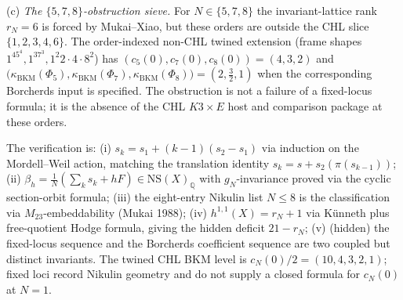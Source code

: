 \begin{remark}
\textup{(c)} \emph{The $\{5,7,8\}$-obstruction sieve.}
For $N\in\{5,7,8\}$ the invariant-lattice rank $r_N = 6$ is forced
by Mukai--Xiao, but these orders are outside the CHL slice
$\{1,2,3,4,6\}$.  The order-indexed non-CHL twined extension (frame
shapes $1^45^4, 1^37^3, 1^2 2\cdot4\cdot8^2$) has
$(c_5(0),c_7(0),c_8(0))=(4,3,2)$ and
$\bigl(\kappa_{\mathrm{BKM}}(\Phi_5),\kappa_{\mathrm{BKM}}(\Phi_7),\kappa_{\mathrm{BKM}}(\Phi_8)\bigr)=(2,\tfrac32,1)$ when the corresponding Borcherds input
is specified.  The obstruction is not a failure of a fixed-locus
formula; it is the absence of the CHL $K3\times E$ host and comparison
package at these orders.

The verification is:
\textup{(i)} $s_k = s_1 + (k-1)(s_2-s_1)$ via induction on the
Mordell--Weil action, matching the translation identity
$s_k = s + s_2(\pi(s_{k-1}))$;
\textup{(ii)} $\beta_h = \tfrac1N(\sum_k s_k + hF)\in\mathrm{NS}(X)_{\mathbb Q}$
with $g_N$-invariance proved via the cyclic section-orbit formula;
\textup{(iii)} the eight-entry Nikulin list $N\le 8$ is the
classification via $M_{23}$-embeddability (Mukai 1988);
\textup{(iv)} $h^{1,1}(X) = r_N + 1$ via K\"unneth plus free-quotient
Hodge formula, giving the hidden deficit $21-r_N$;
\textup{(v)} (hidden) the fixed-locus sequence and the Borcherds
coefficient sequence are two coupled but distinct invariants.  The
twined CHL BKM level is $c_N(0)/2=(10,4,3,2,1)$; fixed loci record
Nikulin geometry and do not supply a closed formula for $c_N(0)$ at
$N = 1$.
\end{remark}

